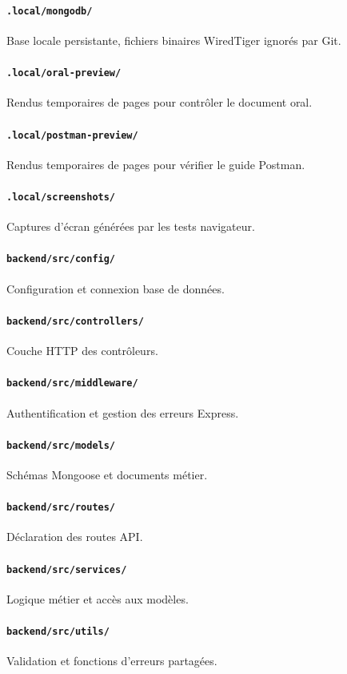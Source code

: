 \documentclass[10pt,a4paper]{article}
\begin{document}
\paragraph{\texttt{.local/mongodb/}} Base locale persistante, fichiers binaires WiredTiger ignorés par Git.
\paragraph{\texttt{.local/oral-preview/}} Rendus temporaires de pages pour contrôler le document oral.
\paragraph{\texttt{.local/postman-preview/}} Rendus temporaires de pages pour vérifier le guide Postman.
\paragraph{\texttt{.local/screenshots/}} Captures d'écran générées par les tests navigateur.
\paragraph{\texttt{backend/src/config/}} Configuration et connexion base de données.
\paragraph{\texttt{backend/src/controllers/}} Couche HTTP des contrôleurs.
\paragraph{\texttt{backend/src/middleware/}} Authentification et gestion des erreurs Express.
\paragraph{\texttt{backend/src/models/}} Schémas Mongoose et documents métier.
\paragraph{\texttt{backend/src/routes/}} Déclaration des routes API.
\paragraph{\texttt{backend/src/services/}} Logique métier et accès aux modèles.
\paragraph{\texttt{backend/src/utils/}} Validation et fonctions d'erreurs partagées.
\end{document}
